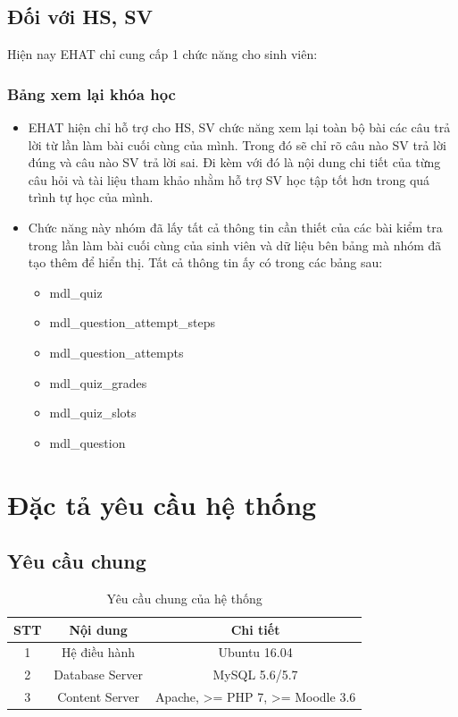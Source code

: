\subsection{Đối với HS, SV}

Hiện nay EHAT chỉ cung cấp 1 chức năng cho sinh viên:

\subsubsection{Bảng xem lại khóa học}
\begin{itemize}
	\item EHAT hiện chỉ hỗ trợ cho HS, SV chức năng xem lại toàn bộ bài các câu trả lời từ lần làm bài cuối cùng của mình. Trong đó sẽ chỉ rõ câu nào SV trả lời đúng và câu nào SV trả lời sai. Đi kèm với đó là nội dung chi tiết của từng câu hỏi và tài liệu tham khảo nhằm hỗ trợ SV học tập tốt hơn trong quá trình tự học của mình.
	
	\item Chức năng này nhóm đã lấy tất cả thông tin cần thiết của các bài kiểm tra trong lần làm bài cuối cùng của sinh viên và dữ liệu bên bảng mà nhóm đã tạo thêm để hiển thị. Tất cả thông tin ấy có trong các bảng sau:
	\begin{itemize}
		\item mdl\_quiz
		\item mdl\_question\_attempt\_steps 
		\item mdl\_question\_attempts
		\item mdl\_quiz\_grades
		\item mdl\_quiz\_slots
		\item mdl\_question
	\end{itemize}
\end{itemize}

\newpage
\section{Đặc tả yêu cầu hệ thống}

\subsection{Yêu cầu chung}

\begin{center}
	\begin{table}[!htp]
		\centering
		\begin{tabular}{|c|c|c|}
			\hline 
			STT & Nội dung & Chi tiết \\ 
			\hline 
			1 & Hệ điều hành & Ubuntu 16.04 \\ 
			\hline 
			2 & Database Server & MySQL  5.6/5.7 \\ 
			\hline 
			3 & Content Server & Apache, >= PHP 7, >= Moodle 3.6 \\ 
			\hline 
		\end{tabular} 
		\caption{Yêu cầu chung của hệ thống}
		\label{bang20}
	\end{table}
\end{center}

